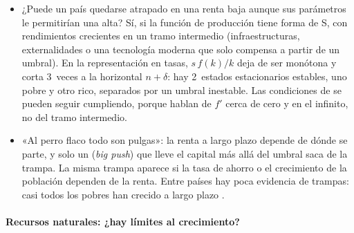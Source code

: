 \documentclass[11pt]{article}
\begin{document}
\begin{itemize}
\item ¿Puede un país quedarse atrapado en una renta baja aunque sus parámetros le permitirían una alta? Sí, si la función de producción tiene forma de S, con rendimientos crecientes en un tramo intermedio (infraestructuras, externalidades o una tecnología moderna que solo compensa a partir de un umbral)\nocite{AzariadisDrazen1990}. En la representación en tasas, $s\,f(k)/k$ deja de ser monótona y corta 3~veces a la horizontal $n+\delta$: hay 2~estados estacionarios estables, uno pobre y otro rico, separados por un umbral inestable. Las condiciones de  se pueden seguir cumpliendo, porque hablan de $f'$ cerca de cero y en el infinito, no del tramo intermedio.
\item «Al perro flaco todo son pulgas»: la renta a largo plazo depende de dónde se parte, y solo un  (\emph{big push}) que lleve el capital más allá del umbral saca de la trampa\nocite{RosensteinRodan1943Problems,MurphyShleiferVishny1989Industrialization}. La misma trampa aparece si la tasa de ahorro o el crecimiento de la población dependen de la renta. Entre países hay poca evidencia de trampas: casi todos los pobres han crecido a largo plazo\nocite{KraayMcKenzie2014Do} .
\end{itemize}

\paragraph{Recursos naturales: ¿hay límites al crecimiento?}
\end{document}
